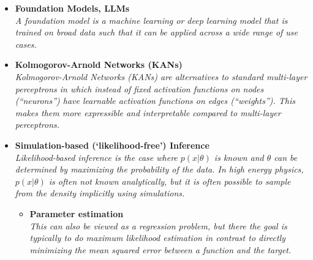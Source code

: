 \documentclass[12pt,letterpaper]{article}
\begin{document}
\begin{itemize}
\item \textbf{Foundation Models, LLMs}~\cite{Tani:2025osu,Mikuni:2025tar,Amram:2024fjg,Ho:2024qyf,OmanaKuttan:2024mwr,Wildridge:2024yeg,Leigh:2024ked,Mikuni:2024qsr,Zhang:2024kws,Fanelli:2024ktq,Harris:2024sra,Birk:2024knn,Vigl:2024lat}
  \\\textit{A foundation model is a machine learning or deep learning model that is trained on broad data such that it can be applied across a wide range of use cases.}
\item \textbf{Kolmogorov-Arnold Networks (KANs)}~\cite{Dai:2025dir,Kou:2024hzd,Abasov:2024hyq,Erdmann:2024unt}
  \\\textit{Kolmogorov-Arnold Networks (KANs) are alternatives to standard multi-layer perceptrons in which instead of fixed activation functions on nodes (``neurons'') have learnable activation functions on edges (``weights''). This makes them more expressible and interpretable compared to multi-layer perceptrons.}
\item \textbf{Simulation-based (`likelihood-free') Inference}
\\\textit{Likelihood-based inference is the case where $p(x|\theta)$ is known and $\theta$ can be determined by maximizing the probability of the data.  In high energy physics, $p(x|\theta)$ is often not known analytically, but it is often possible to sample from the density implicitly using simulations.}
	\begin{itemize}
		\item \textbf{Parameter estimation}~\cite{Hammad:2025ewr,Hirono:2025aqc,Zhang:2025mmm,Nishimura:2025knz,Acosta:2025lsu,Sluijter:2025isc,Araz:2025ezp,DeLuca:2025ruv,Villarreal:2025mhv,Aarts:2025gyp,Alda:2024sup,ATLAS:2024ynn,Heimel:2024drk,Maitre:2024hzp,Bahl:2024meb,JETSCAPE:2024cqe,Mastandrea:2024irf,Diaz:2024yfu,Alvarez:2024owq,Chatterjee:2024pbp,Chai:2024zyl,Heimel:2023mvw,Espejo:2023wzf,Barrue:2023ysk,Morandini:2023pwj,Erdogan:2023uws,Breitenmoser:2023tmi,Heinrich:2023bmt,Rizvi:2023mws,Neubauer:2022gbu,Butter:2022vkj,Arganda:2022zbs,Kong:2022rnd,Arganda:2022qzy,Bahl:2021dnc,Barman:2021yfh,Mishra-Sharma:2021oxe,NEURIPS2020_a878dbeb,Chatterjee:2021nms,Nachman:2021yvi,Bieringer:2020tnw,Flesher:2020kuy,Coogan:2020yux,Andreassen:2020gtw,Cranmer:2015bka,Brehmer:2018hga,Brehmer:2019xox,Brehmer:2018eca,Brehmer:2018kdj,Hollingsworth:2020kjg,Stoye:2018ovl,Andreassen:2019nnm}
		\\\textit{This can also be viewed as a regression problem, but there the goal is typically to do maximum likelihood estimation in contrast to directly minimizing the mean squared error between a function and the target.}

\end{itemize}
\end{itemize}
\end{document}
